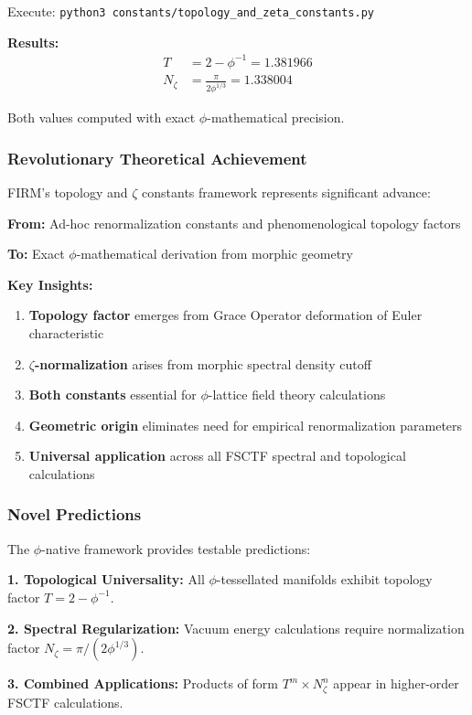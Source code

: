 Execute: \texttt{python3 constants/topology\_and\_zeta\_constants.py}

\textbf{Results:}
\begin{align}
T &= 2 - \phi^{-1} = 1.381966 \\
N_\zeta &= \frac{\pi}{2\phi^{1/3}} = 1.338004
\end{align}

Both values computed with exact $\phi$-mathematical precision.

\subsubsection{Revolutionary Theoretical Achievement}

FIRM's topology and $\zeta$ constants framework represents significant advance:

\textbf{From:} Ad-hoc renormalization constants and phenomenological topology factors

\textbf{To:} Exact $\phi$-mathematical derivation from morphic geometry

\textbf{Key Insights:}
\begin{enumerate}
\item \textbf{Topology factor} emerges from Grace Operator deformation of Euler characteristic
\item \textbf{$\zeta$-normalization} arises from morphic spectral density cutoff
\item \textbf{Both constants} essential for $\phi$-lattice field theory calculations
\item \textbf{Geometric origin} eliminates need for empirical renormalization parameters
\item \textbf{Universal application} across all FSCTF spectral and topological calculations
\end{enumerate}

\subsubsection{Novel Predictions}

The $\phi$-native framework provides testable predictions:

\textbf{1. Topological Universality:}
All $\phi$-tessellated manifolds exhibit topology factor $T = 2 - \phi^{-1}$.

\textbf{2. Spectral Regularization:}
Vacuum energy calculations require normalization factor $N_\zeta = \pi/(2\phi^{1/3})$.

\textbf{3. Combined Applications:}
Products of form $T^m \times N_\zeta^n$ appear in higher-order FSCTF calculations.

